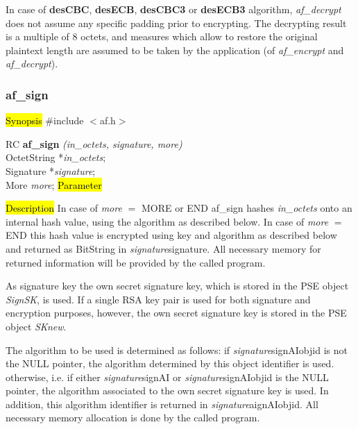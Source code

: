    In case of {\bf desCBC}, {\bf desECB}, {\bf desCBC3} or {\bf desECB3} algorithm, {\em af\_decrypt} does
   not assume any specific padding prior to encrypting. The decrypting result is a multiple
   of 8 octets, and measures which allow to restore the original plaintext length are 
   assumed to be taken by the application (of {\em af\_encrypt} and {\em af\_decrypt}).

\subsubsection{af\_sign}
\label{af_sign}
\hl{Synopsis}
\#include $<$af.h$>$

RC {\bf af\_sign} {\em (in\_octets, signature, more)} \\
OctetString *{\em in\_octets}; \\
Signature *{\em signature}; \\
More {\em more};
\hl{Parameter}



\hl{Description}
In case of {\em more} $=$ MORE or END af\_sign hashes {\em in\_octets} onto
an internal hash value, using the algorithm as described below.
In case of {\em more} $=$ END this hash value is encrypted using key and
algorithm as described below and returned as BitString in {\em signature}\pf signature.
All necessary memory for returned information will be provided by the
called program.

As signature key the own secret signature key, which is stored in the PSE
object {\em SignSK}, is used. If a single RSA key pair is used for both signature and encryption purposes, however,
the own secret signature key is stored in the PSE object {\em SKnew}. 

The algorithm to be used is determined as follows:
\be
\m if {\em signature}\pf signAI\pf objid is not the NULL pointer, the algorithm
   determined by this object identifier is used.
\m otherwise, i.e. if either {\em signature}\pf signAI or {\em signature}\pf signAI\pf objid 
   is the NULL pointer, the algorithm
   associated to the own secret signature key is used.
   In addition, this algorithm identifier is returned in {\em signature}\pf aignAI\pf objid.
   All necessary memory allocation is done by the called program.
\ee

